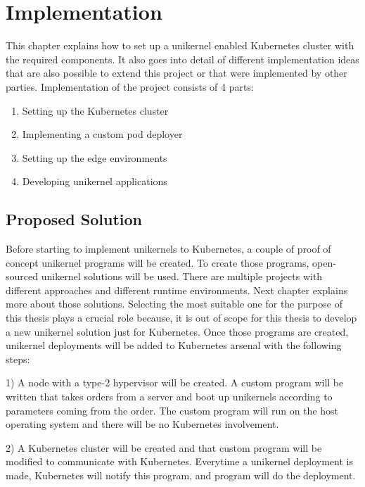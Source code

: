 \chapter{Implementation}\label{chapter:implementation}
This chapter explains how to set up a unikernel enabled Kubernetes cluster with the required components. It also goes into detail of different implementation ideas that are also possible to extend this project or that were implemented by other parties. Implementation of the project consists of 4 parts:
\begin{enumerate}
\item Setting up the Kubernetes cluster
\item Implementing a custom pod deployer
\item Setting up the edge environments
\item Developing unikernel applications
\end{enumerate}








\iffalse
\section{Proposed Solution}

Before starting to implement unikernels to Kubernetes, a couple of proof of concept unikernel programs will be created. To create those programs, open-sourced unikernel solutions will be used. There are multiple projects with different approaches and different runtime environments. Next chapter explains more about those solutions. Selecting the most suitable one for the purpose of this thesis plays a crucial role because, it is out of scope for this thesis to develop a new unikernel solution just for Kubernetes. Once those programs are created, unikernel deployments will be added to Kubernetes arsenal with the following steps:

1) A node with a type-2 hypervisor will be created. A custom program will be written that takes orders from a server and boot up unikernels according to parameters coming from the order. The custom program will run on the host operating system and there will be no Kubernetes involvement.

2) A Kubernetes cluster will be created and that custom program will be modified to communicate with Kubernetes. Everytime a unikernel deployment is made, Kubernetes will notify this program, and program will do the deployment.

